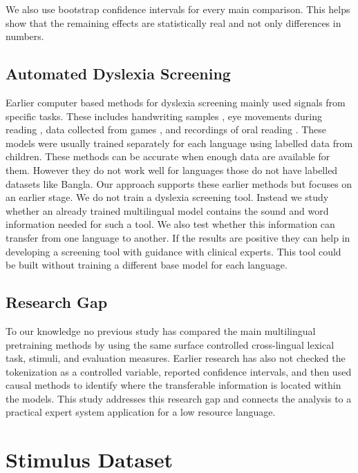 \documentclass[preprint,12pt]{elsarticle}
\begin{document}
We also use bootstrap confidence intervals \cite{efron1994bootstrap} for every main comparison. This helps show that the remaining effects are statistically real and not only differences in numbers.

\subsection{Automated Dyslexia Screening}
Earlier computer based methods for dyslexia screening mainly used signals from specific tasks. These includes handwriting samples \cite{spoon2019handwriting}, eye movements during reading \cite{benfatto2016eyetracking}, data collected from games \cite{rello2020gamified}, and recordings of oral reading \cite{tas2023audio}. These models were usually trained separately for each language using labelled data from children.
These methods can be accurate when enough data are available for them. However they do not work well for languages those do not have labelled datasets like Bangla.
Our approach supports these earlier methods but focuses on an earlier stage. We do not train a dyslexia screening tool. Instead we study whether an already trained multilingual model contains the sound and word information needed for such a tool. We also test whether this information can transfer from one language to another.
If the results are positive they can help in developing a screening tool with guidance with clinical experts. This tool could be built without training a different base model for each language.

\subsection{Research Gap}
To our knowledge no previous study has compared the main multilingual pretraining methods by using the same surface controlled cross-lingual lexical task, stimuli, and evaluation measures. Earlier research has also not checked the tokenization as a controlled variable, reported confidence intervals, and then used causal methods to identify where the transferable information is located within the models. This study addresses this research gap and connects the analysis to a practical expert system application for a low resource language.

\section{Stimulus Dataset}
\label{sec:data}
\end{document}
